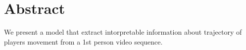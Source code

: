 \chapter{Abstract}

\begin{english}
We present a model that extract intorpretable information about trajectory of players movement from a 1st person video sequence.

\end{english}
